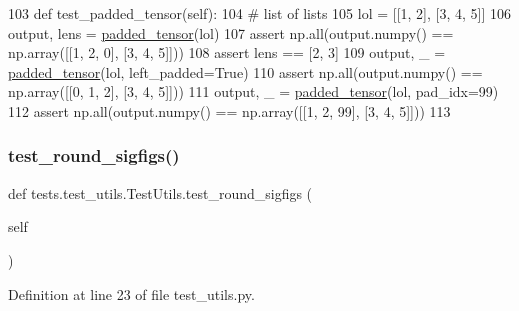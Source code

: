 \begin{DoxyCode}
103     \textcolor{keyword}{def }test\_padded\_tensor(self):
104         \textcolor{comment}{# list of lists}
105         lol = [[1, 2], [3, 4, 5]]
106         output, lens = \hyperlink{namespaceparlai_1_1agents_1_1legacy__agents_1_1seq2seq_1_1utils__v1_adb5a414ae439f14c54e8c760b91cc4c8}{padded\_tensor}(lol)
107         \textcolor{keyword}{assert} np.all(output.numpy() == np.array([[1, 2, 0], [3, 4, 5]]))
108         \textcolor{keyword}{assert} lens == [2, 3]
109         output, \_ = \hyperlink{namespaceparlai_1_1agents_1_1legacy__agents_1_1seq2seq_1_1utils__v1_adb5a414ae439f14c54e8c760b91cc4c8}{padded\_tensor}(lol, left\_padded=\textcolor{keyword}{True})
110         \textcolor{keyword}{assert} np.all(output.numpy() == np.array([[0, 1, 2], [3, 4, 5]]))
111         output, \_ = \hyperlink{namespaceparlai_1_1agents_1_1legacy__agents_1_1seq2seq_1_1utils__v1_adb5a414ae439f14c54e8c760b91cc4c8}{padded\_tensor}(lol, pad\_idx=99)
112         \textcolor{keyword}{assert} np.all(output.numpy() == np.array([[1, 2, 99], [3, 4, 5]]))
113 
\end{DoxyCode}
\mbox{\label{classtests_1_1test__utils_1_1TestUtils_aa020fc67900c834a020730f29cacc916}} 
\subsubsection{\texorpdfstring{test\+\_\+round\+\_\+sigfigs()}{test\_round\_sigfigs()}}
{\footnotesize\ttfamily def tests.\+test\+\_\+utils.\+Test\+Utils.\+test\+\_\+round\+\_\+sigfigs (\begin{DoxyParamCaption}\item[{}]{self }\end{DoxyParamCaption})}



Definition at line 23 of file test\+\_\+utils.\+py.



